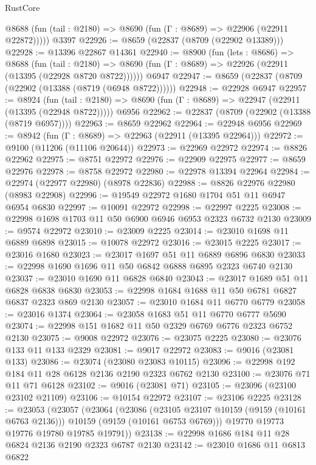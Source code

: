 \begin{lexlean}{RustCore}
\begin{coremodule}
      @8688 (fun (tail : @2180) => @8690 (fun (Γ : @8689) => @22906 (@22911 @22872)))))
    @3397
@22926 := @8659 (@22837 (@8709 (@22902 @13389)))
@22928 := @13396 @22867 @14361
@22940 := @8900
    (fun (lets : @8686) =>
    @8688
      (fun (tail : @2180) =>
      @8690 (fun (Γ : @8689) => @22926 (@22911 (@13395 (@22928 @8720 @8722))))))
    @6947
@22947 := @8659 (@22837 (@8709 (@22902 (@13388 (@8719 (@6948 @8722))))))
@22948 := @22928 @6947
@22957 := @8924
    (fun (tail : @2180) => @8690 (fun (Γ : @8689) => @22947 (@22911 (@13395 (@22948 @8722)))))
    @6956
@22962 := @22837 (@8709 (@22902 (@13388 (@8719 @6957))))
@22963 := @8659 @22962
@22964 := @22948 @6956
@22969 := @8942 (fun (Γ : @8689) => @22963 (@22911 (@13395 @22964)))
@22972 := @9100 (@11206 (@11106 @20644))
@22973 := @22969 @22972
@22974 := @8826 @22962
@22975 := @8751 @22972
@22976 := @22909 @22975
@22977 := @8659 @22976
@22978 := @8758 @22972
@22980 := @22978 @13394 @22964
@22984 := @22974 (@22977 @22980) (@8978 @22836)
@22988 := @8826 @22976 @22980 (@8983 @22908)
@22996 := @19549 @22972 @1680 @1704 @51 @11 @6947 @6954 @6830
@22997 := @10091 @22972
@22998 := @22997 @2225
@23008 := @22998 @1698 @1703 @11 @50 @6900 @6946 @6953 @2323 @6732 @2130
@23009 := @9574 @22972
@23010 := @23009 @2225
@23014 := @23010 @1698 @11 @6889 @6898
@23015 := @10078 @22972
@23016 := @23015 @2225
@23017 := @23016 @1680
@23023 := @23017 @1697 @51 @11 @6889 @6896 @6830
@23033 := @22998 @1690 @1696 @11 @50 @6842 @6888 @6895 @2323 @6740 @2130
@23037 := @23010 @1690 @11 @6828 @6840
@23043 := @23017 @1689 @51 @11 @6828 @6838 @6830
@23053 := @22998 @1684 @1688 @11 @50 @6781 @6827 @6837 @2323 @869 @2130
@23057 := @23010 @1684 @11 @6770 @6779
@23058 := @23016 @1374
@23064 := @23058 @1683 @51 @11 @6770 @6777 @5690
@23074 := @22998 @151 @1682 @11 @50 @2329 @6769 @6776 @2323 @6752 @2130
@23075 := @9008 @22972
@23076 := @23075 @2225
@23080 := @23076 @133 @11 @133 @2329
@23081 := @9017 @22972
@23083 := @9016 (@23081 @133)
@23086 := @23074 (@23080 @23083 @10115)
@23096 := @22998 @192 @184 @11 @28 @6128 @2136 @2190 @2323 @6762 @2130
@23100 := @23076 @71 @11 @71 @6128
@23102 := @9016 (@23081 @71)
@23105 := @23096 (@23100 @23102 @21109)
@23106 := @10154 @22972
@23107 := @23106 @2225
@23128 := @23053
    (@23057
      (@23064
        (@23086
          (@23105 @23107 @10159 (@9159 (@10161 @6763 @2136)))
          @10159
          (@9159 (@10161 @6753 @6769)))
        @19770
        @19773
        @19776
        @19780
        @19785
        @19791))
@23138 := @22998 @1686 @184 @11 @28 @6824 @2136 @2190 @2323 @6787 @2130
@23142 := @23010 @1686 @11 @6813 @6822

\end{coremodule}
\end{lexlean}
